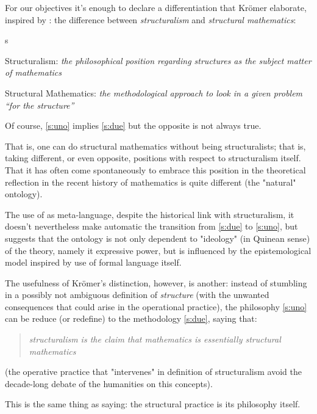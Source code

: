 For our objectives it's enough to declare a differentiation that Kr\"omer elaborate, inspired by \cite{Cor96}: the difference between \emph{structuralism} and \emph{structural mathematics}:
\begin{enumtag}{s}
	\item \label{s:uno} Structuralism: \textit{the philosophical
		position regarding structures as the subject matter of mathematics}
	\item \label{s:due} Structural Mathematics: \textit{the methodological approach to look in a given problem
		“for the structure”}
\end{enumtag}
\begin{remark} \label{weak_structuralism}
	Of course, \ref{s:uno} implies \ref{s:due} but the opposite is not always true.

	That is, one can do structural mathematics without being structuralists; that is, taking different, or even opposite, positions with respect to structuralism itself. That it has often come spontaneously to embrace this position in the theoretical reflection in the recent history of mathematics is quite different (the "natural" ontology).

	The use of  as meta-language, despite the historical link with structuralism, it doesn't nevertheless make automatic the transition from \ref{s:due} to  \ref{s:uno}, but suggests that the ontology is not only dependent to "ideology" (in Quinean sense) of the theory, namely it expressive power, but is influenced by the epistemological model inspired by use of formal language itself.
\end{remark}
The usefulness of Kr\"omer's distinction, however, is another: instead of stumbling in a possibly not ambiguous definition of \textit{structure} (with the unwanted consequences that could arise in the operational practice), the philosophy \ref{s:uno} can be reduce (or redefine) to the methodology \ref{s:due}, saying that:

\begin{quote}
	\emph{structuralism is the claim that mathematics
		is essentially structural mathematics} \cite{kromer2007tool}
\end{quote}

(the operative practice that "intervenes" in definition of structuralism avoid the decade-long debate of the humanities on this concepts).


This is the same thing as saying: the structural practice is its philosophy itself.

